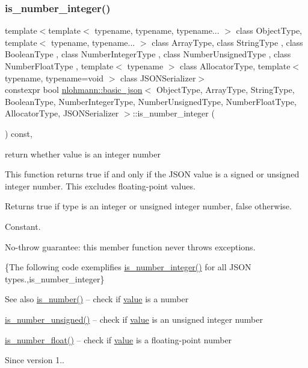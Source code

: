 \subsubsection{\texorpdfstring{is\+\_\+number\+\_\+integer()}{is\_number\_integer()}}
{\footnotesize\ttfamily template$<$template$<$ typename, typename, typename... $>$ class Object\+Type, template$<$ typename, typename... $>$ class Array\+Type, class String\+Type , class Boolean\+Type , class Number\+Integer\+Type , class Number\+Unsigned\+Type , class Number\+Float\+Type , template$<$ typename $>$ class Allocator\+Type, template$<$ typename, typename=void $>$ class J\+S\+O\+N\+Serializer$>$ \\
constexpr bool \hyperlink{classnlohmann_1_1basic__json}{nlohmann\+::basic\+\_\+json}$<$ Object\+Type, Array\+Type, String\+Type, Boolean\+Type, Number\+Integer\+Type, Number\+Unsigned\+Type, Number\+Float\+Type, Allocator\+Type, J\+S\+O\+N\+Serializer $>$\+::is\+\_\+number\+\_\+integer (\begin{DoxyParamCaption}{ }\end{DoxyParamCaption}) const\hspace{0.3cm}{\ttfamily [inline]}, {\ttfamily [noexcept]}}



return whether value is an integer number 

This function returns true if and only if the J\+S\+ON value is a signed or unsigned integer number. This excludes floating-\/point values.

\begin{DoxyReturn}{Returns}
{\ttfamily true} if type is an integer or unsigned integer number, {\ttfamily false} otherwise.
\end{DoxyReturn}
Constant.

No-\/throw guarantee\+: this member function never throws exceptions.

\{The following code exemplifies {\ttfamily \hyperlink{classnlohmann_1_1basic__json_abac8af76067f1e8fdca9052882c74428}{is\+\_\+number\+\_\+integer()}} for all J\+S\+ON types.,is\+\_\+number\+\_\+integer\}

\begin{DoxySeeAlso}{See also}
\hyperlink{classnlohmann_1_1basic__json_a2b9852390abb4b1ef5fac6984e2fc0f3}{is\+\_\+number()} -- check if \hyperlink{classnlohmann_1_1basic__json_adcf8ca5079f5db993820bf50036bf45d}{value} is a number 

\hyperlink{classnlohmann_1_1basic__json_abc7378cba0613a78b9aad1c8e7044bb0}{is\+\_\+number\+\_\+unsigned()} -- check if \hyperlink{classnlohmann_1_1basic__json_adcf8ca5079f5db993820bf50036bf45d}{value} is an unsigned integer number 

\hyperlink{classnlohmann_1_1basic__json_a33b4bf898b857c962e798fc7f6e86e70}{is\+\_\+number\+\_\+float()} -- check if \hyperlink{classnlohmann_1_1basic__json_adcf8ca5079f5db993820bf50036bf45d}{value} is a floating-\/point number
\end{DoxySeeAlso}
\begin{DoxySince}{Since}
version 1.. 
\end{DoxySince}


